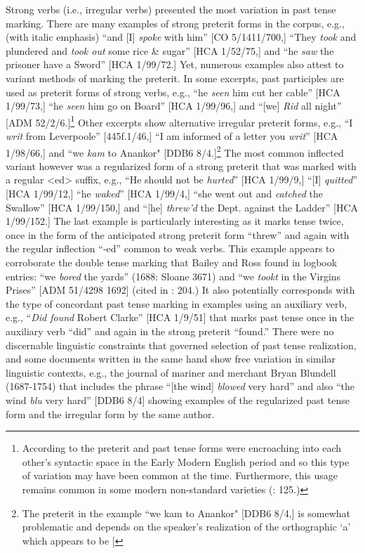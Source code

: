 Strong verbs (i.e., irregular verbs) presented the most variation in past tense marking. There are many examples of strong preterit forms in the corpus, e.g., (with italic emphasis) “and [I] \textit{spoke} with him” [CO 5/1411/700,] “They \textit{took} and plundered and \textit{took out} some rice \& sugar” [HCA 1/52/75,] and “he \textit{saw} the prisoner have a Sword” [HCA 1/99/72.] Yet, numerous examples also attest to variant methods of marking the preterit. In some excerpts, past participles are used as preterit forms of strong verbs, e.g., “he \textit{seen} him cut her cable” [HCA 1/99/73,] “he \textit{seen} him go on Board” [HCA 1/99/96,] and “[we] \textit{Rid} all night” [ADM 52/2/6.]\footnote{According to \citet[95]{Blake2002} the preterit and past tense forms were encroaching into each other’s syntactic space in the Early Modern English period and so this type of variation may have been common at the time. Furthermore, this usage remains common in some modern non-standard varieties (\citealt{Cheshire1994}: 125.)} Other excerpts show alternative irregular preterit forms, e.g., “I \textit{writ} from Leverpoole” [445f.1/46,] “I am informed of a letter you \textit{writ}” [HCA 1/98/66,] and “we \textit{kam} to Anankor" [DDB6 8/4.]\footnote{The preterit in the example “we kam to Anankor" [DDB6 8/4,] is somewhat problematic and depends on the speaker’s realization of the orthographic ‘a’ which appears to be [\textcyrillic{ӕ] but could just have likely been realized as the diphthong [a\textlatin{ɪ}] or another allophonic variant acceptable in contemporary usage.} } The most common inflected variant however was a regularized form of a strong preterit that was marked with a regular <ed> suffix, e.g., “He should not be \textit{hurted}” [HCA 1/99/9,] “[I] \textit{quitted}” [HCA 1/99/12,] “he \textit{waked}” [HCA 1/99/4,] “she went out and \textit{catched} the Swallow” [HCA 1/99/150,] and “[he] \textit{threw’d} the Dept. against the Ladder” [HCA 1/99/152.] The last example is particularly interesting as it marks tense twice, once in the form of the anticipated strong preterit form “threw” and again with the regular inflection “-ed” common to weak verbs. This example appears to corroborate the double tense marking that Bailey and Ross found in logbook entries: “we \textit{bored} the yards” (1688: Sloane 3671) and “we \textit{tookt} in the Virgins Prises” [ADM 51/4298 1692] (cited in \citealt{BaileyRoss1988}: 204.) It also potentially corresponds with the type of concordant past tense marking in examples using an auxiliary verb, e.g., “\textit{Did found} Robert Clarke” [HCA 1/9/51] that marks past tense once in the auxiliary verb “did” and again in the strong preterit “found.” There were no discernable linguistic constraints that governed selection of past tense realization, and some documents written in the same hand show free variation in similar linguistic contexts, e.g., the journal of mariner and merchant Bryan Blundell (1687-1754) that includes the phrase “[the wind] \textit{blowed} very hard” and also “the wind \textit{blu} very hard” [DDB6 8/4] showing examples of the regularized past tense form and the irregular form by the same author. 

